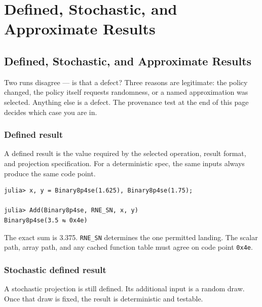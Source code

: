 \chapter{Defined, Stochastic, and Approximate Results}


\section{Defined, Stochastic, and Approximate Results}



\label{17916110801740594422}{}


Two runs disagree — is that a defect? Three reasons are legitimate: the policy changed, the policy itself requests randomness, or a named approximation was selected. Anything else is a defect. The provenance test at the end of this page decides which case you are in.



\subsection{Defined result}



\label{2016786191834434104}{}


A defined result is the value required by the selected operation, result format, and projection specification. For a deterministic spec, the same inputs always produce the same code point.




\begin{verbatim}
julia> x, y = Binary8p4se(1.625), Binary8p4se(1.75);

julia> Add(Binary8p4se, RNE_SN, x, y)
Binary8p4se(3.5 ⇆ 0x4e)
\end{verbatim}



The exact sum is 3.375. \texttt{RNE\_\allowbreak{}SN} determines the one permitted landing. The scalar path, array path, and any cached function table must agree on code point \texttt{0x4e}.



\subsection{Stochastic defined result}



\label{336622858987232683}{}


A stochastic projection is still defined. Its additional input is a random draw. Once that draw is fixed, the result is deterministic and testable.




